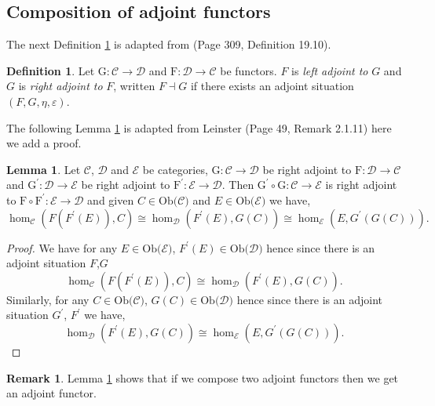 \documentclass[11pt,a4paper]{article}
\theoremstyle{definition}
\newtheorem{lemma}[thm]{Lemma}
\newtheorem{definition}[thm]{Definition}
\newtheorem{remark}[thm]{Remark}
\newcommand\ho[3][]{\hom_{#1}(#2,#3)}
\newcommand\ob[1]{\mathrm{Ob(}#1\mathrm{)}}
\newcommand\cat[1]{\mathscr{#1}}
\newcommand\func[3]{\mathrm{#1}\colon#2\rightarrow#3}
\numberwithin{equation}{section}
\begin{document}
\subsection{Composition of adjoint functors}
\label{ss:compadj}

The next Definition \ref{def:FadjointtoG} is adapted from \cite{ACC} (Page 309, Definition 19.10).

\begin{definition}
    \label{def:FadjointtoG}
    Let $\func{G}{\cat{C}}{\cat{D}}$ and $\func{F}{\cat{D}}{\cat{C}}$ be functors. $F$ is \emph{left adjoint to} $G$ and $G$ is \emph{right adjoint to} $F$, written $F\dashv G$ if there exists an adjoint situation $(F,G,\eta,\varepsilon)$.
\end{definition}

The following Lemma \ref{lem:comadjoint} is adapted from Leinster \cite{Leinster} (Page 49, Remark 2.1.11) here we add a proof. 
\begin{lemma}
\label{lem:comadjoint}
    Let $\cat{C}$, $\cat{D}$ and $\cat{E}$ be categories, $\func{G}{\cat{C}}{\cat{D}}$ be right adjoint to $\func{F}{\cat{D}}{\cat{C}}$ and $\func{G^\prime}{\cat{D}}{\cat{E}}$ be right adjoint to $\func{F^\prime}{\cat{E}}{\cat{D}}$. Then $\func{G^\prime \circ G}{\cat{C}}{\cat{E}}$ is right adjoint to $\func{F \circ F^\prime}{\cat{E}}{\cat{D}}$ and given $C\in\ob{\cat{C}}$ and $E\in\ob{\cat{E}}$ we have,
    \[\ho[\cat{C}]{F(F^\prime(E))}{C}\cong \ho[\cat{D}]{F^\prime(E)}{G(C)}\cong\ho[\cat{E}]{E}{G^{\prime}(G(C))}.\]
\end{lemma}
\begin{proof}
    We have for any $E\in\ob{\cat{E}}$, $F^\prime(E) \in \ob{\cat{D}}$ hence since there is an adjoint situation $F$,$G$ \[\ho[\cat{C}]{F(F^\prime(E))}{C}\cong \ho[\cat{D}]{F^\prime(E)}{G(C)}.\] Similarly, for any $C\in\ob{\cat{C}}$, $G(C)\in\ob{\cat{D}}$ hence since there is an adjoint situation $G^\prime$, $F^\prime$ we have,
    \[\ho[\cat{D}]{F^\prime(E)}{G(C)}\cong\ho[\cat{E}]{E}{G^{\prime}(G(C))}.\]
\end{proof}
\begin{remark}
    Lemma \ref{lem:comadjoint} shows that if we compose two adjoint functors then we get an adjoint functor. 
\end{remark}



\end{document}
